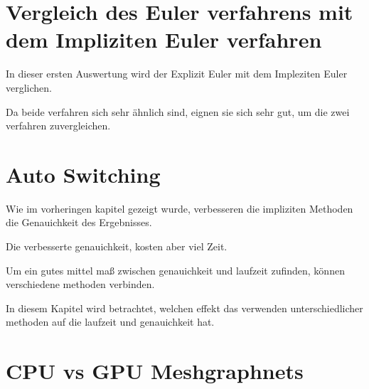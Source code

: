 


   


   
   

  
  
  
  
  
  
  
  
  
  
  
  
  
  
  
  
  
  
  
 
 
 
 
 
 
 
 
 
 
 
 
 
 
 
 
 
 
 


\section{Vergleich des Euler verfahrens mit dem Impliziten Euler verfahren}

In dieser ersten Auswertung wird der Explizit Euler mit dem Impleziten Euler verglichen.

Da beide verfahren sich sehr ähnlich sind, eignen sie sich sehr gut, um die zwei verfahren zuvergleichen.

\section{Auto Switching}

Wie im vorheringen kapitel gezeigt wurde, verbesseren die impliziten Methoden die Genauichkeit des Ergebnisses.

Die verbesserte genauichkeit, kosten aber viel Zeit.

Um ein gutes mittel maß zwischen genauichkeit und laufzeit zufinden, können verschiedene methoden verbinden.

In diesem Kapitel wird betrachtet, welchen effekt das verwenden unterschiedlicher methoden auf die laufzeit und genauichkeit hat.

\section{CPU vs GPU Meshgraphnets}















